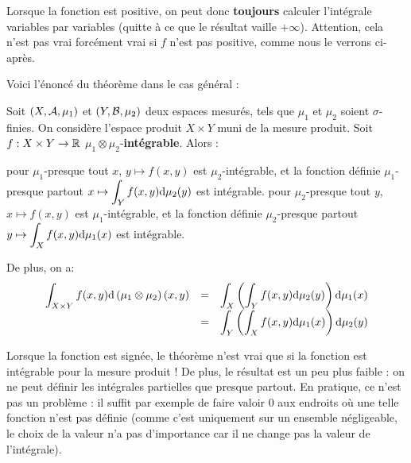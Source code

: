 \documentclass[../integ-proba.tex]{subfiles}
\begin{document}
  \begin{rem}
    Lorsque la fonction est positive, on peut donc \textbf{toujours} calculer l'intégrale variables par variables (quitte à ce que le résultat vaille $+\infty$).
    Attention, cela n'est pas vrai forcément vrai si $f$ n'est pas positive, comme nous le verrons ci-après.
  \end{rem}

  Voici l'énoncé du théorème dans le cas général :

  \begin{thm}
    \label{thm:fubini}
    Soit $\left(X, \mathcal{A}, \mu_1\right)$ et $\left(Y, \mathcal{B}, \mu_2\right)$ deux espaces mesurés, tels que $\mu_1$ et $\mu_2$ soient $\sigma$-finies.
    On considère l'espace produit $X \times Y$ muni de la mesure produit.
    Soit $f:X \times Y \rightarrow \mathbb{R}$ $\mu_1 \otimes \mu_2$-\textbf{intégrable}.
    Alors :
    \begin{itemize}
      \itemb pour $\mu_1$-presque tout $x$, $y \mapsto f(x,y)$ est $\mu_2$-intégrable, et la fonction définie $\mu_1$-presque partout $\displaystyle x \mapsto \int_Y f(x,y) \textnormal{d}\mu_2(y)$ est intégrable.
      \itemb pour $\mu_2$-presque tout $y$, $x \mapsto f(x,y)$ est $\mu_1$-intégrable, et la fonction définie $\mu_2$-presque partout $\displaystyle y \mapsto \int_X f(x,y) \textnormal{d}\mu_1(x)$ est intégrable.
    \end{itemize}

    De plus, on a:
    \begin{displaymath}
      {
    \everymath={\displaystyle}
    \begin{array}{rcl}
      \int_{X \times Y} f(x,y) \textnormal{d} \left(\mu_1 \otimes \mu_2 \right) (x,y) & = & \int_X \left( \int_Y f(x,y) \textnormal{d} \mu_2(y) \right) \textnormal{d} \mu_1(x)\\
                                                                                      & = & \int_Y \left( \int_X f(x,y) \textnormal{d} \mu_1(x) \right) \textnormal{d} \mu_2(y)\\
    \end{array}
    }
    \end{displaymath}
  \end{thm}

  \begin{rem}
    Lorsque la fonction est signée, le théorème n'est vrai que si la fonction est intégrable pour la mesure produit !
    De plus, le résultat est un peu plus faible : on ne peut définir les intégrales partielles que presque partout.
    En pratique, ce n'est pas un problème : il suffit par exemple de faire valoir $0$ aux endroits où une telle fonction n'est pas définie (comme c'est uniquement sur un ensemble négligeable, le choix de la valeur n'a pas d'importance car il ne change pas la valeur de l'intégrale).
  \end{rem}
\end{document}
